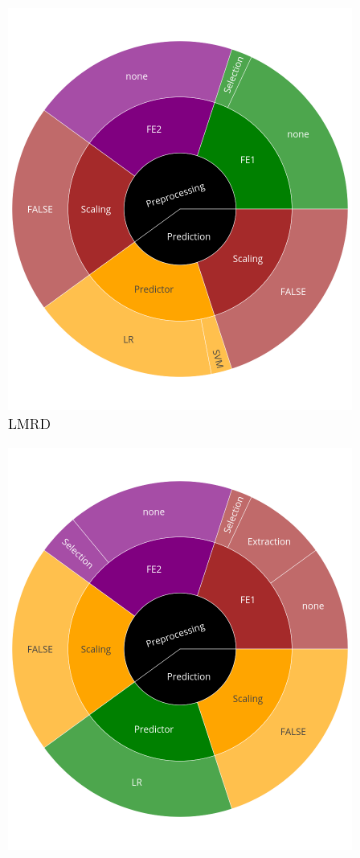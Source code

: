 \begin{figure}
  	\begin{subfigure}[t]{0.3\textwidth}
    \centering\includegraphics[width=\textwidth]{img/sunburst/lmrd.png}
    \caption{LMRD}
  	\end{subfigure}
  	\begin{subfigure}[t]{0.3\textwidth}
    \centering\includegraphics[width=\textwidth]{img/sunburst/reuters.png}

\end{subfigure}
\end{figure}
